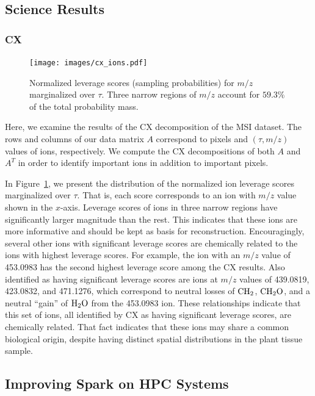   \subsection{Science Results}
  \subsubsection{CX}
  
  \begin{figure}[h!bt]
    \centering
    \texttt{[image: images/cx\_ions.pdf]}
      \caption{Normalized leverage scores (sampling probabilities) for $m/z$ marginalized over $\tau$.
        Three narrow regions of $m/z$ account for $59.3\%$ of the total probability mass.}
      \label{fig:cx_ions}
  \end{figure} 

  Here, we examine the results of the CX decomposition of the MSI dataset.
  The rows and columns of our data matrix $A$ correspond to pixels and $(\tau, m/z)$ values of ions, respectively. 
  We compute the CX decompositions of both $A$ and $A^T$ in order to identify important ions in addition to important pixels.
   
  In Figure~\ref{fig:cx_ions}, we present the distribution of the normalized
  ion leverage scores marginalized over $\tau$. That is, each score corresponds
  to an ion with $m/z$ value shown in the $x$-axis. Leverage scores of ions in
  three narrow regions have significantly larger magnitude than the rest. This
  indicates that these ions are more informative and should be kept as basis
  for reconstruction.  Encouragingly, several other ions with significant
  leverage scores are chemically related to the ions with highest leverage
  scores.  For example, the ion with an $m/z$ value of 453.0983 has the second
  highest leverage score among the CX results.  Also identified as having
  significant leverage scores are ions at $m/z$ values of 439.0819, 423.0832,
  and 471.1276, which correspond to neutral losses of $\rm{CH_2}$,
  $\rm{CH_2O}$, and a neutral ``gain'' of $\rm{H_2O}$ from the 453.0983 ion.
  These relationships indicate that this set of ions, all identified by CX as
  having significant leverage scores, are chemically related.  That fact
  indicates that these ions may share a common biological origin, despite
  having distinct spatial distributions in the plant tissue sample.
  

  \subsection{Improving Spark on HPC Systems}
  \label{sect:lessons}
  
  

